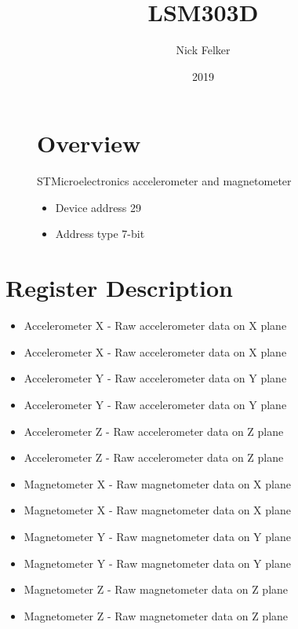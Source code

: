 \documentclass[a4paper,12pt,oneside,pdflatex,italian,final,twocolumn]{article}
\title{ LSM303D }
\author{ Nick Felker }
\date{ 2019 }
\begin{document}
\pagestyle{fancy}



\onecolumn


\begin{figure}
\begin{minipage}{0.47\textwidth}

\section{Overview}
    STMicroelectronics accelerometer and magnetometer
    \begin{itemize}
        \item Device address 29
        \item Address type 7-bit
    \end{itemize}


\end{minipage}
\hfill

\end{figure}


\section{Register Description}
\begin{itemize}
\item Accelerometer X - Raw accelerometer data on X plane
\item Accelerometer X - Raw accelerometer data on X plane
\item Accelerometer Y - Raw accelerometer data on Y plane
\item Accelerometer Y - Raw accelerometer data on Y plane
\item Accelerometer Z - Raw accelerometer data on Z plane
\item Accelerometer Z - Raw accelerometer data on Z plane
\item Magnetometer X - Raw magnetometer data on X plane
\item Magnetometer X - Raw magnetometer data on X plane
\item Magnetometer Y - Raw magnetometer data on Y plane
\item Magnetometer Y - Raw magnetometer data on Y plane
\item Magnetometer Z - Raw magnetometer data on Z plane
\item Magnetometer Z - Raw magnetometer data on Z plane
\end{itemize}
\end{document}

